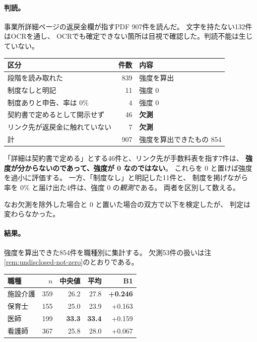 \paragraph{判読。}

事業所詳細ページの返戻金欄が指すPDF 907件を読んだ。
文字を持たない132件はOCRを通し、
OCRでも確定できない箇所は目視で確認した。判読不能は生じていない。

\begin{center}
\begin{tabularx}{\textwidth}{@{}lrX@{}}
\toprule
区分 & 件数 & 内容 \\
\midrule
段階を読み取れた & 839 & 強度を算出 \\
制度なしと明記 & 11 & 強度 0 \\
制度ありと申告、率は 0\% & 4 & 強度 0 \\
契約書で定めるとして開示せず & 46 & \textbf{欠測} \\
リンク先が返戻金に触れていない & 7 & \textbf{欠測} \\
\midrule
計 & 907 & 強度を算出できたもの 854 \\
\bottomrule
\end{tabularx}
\label{tab:henreikin-read}
\end{center}

\begin{remark}
\label{rem:undisclosed-not-zero}
「詳細は契約書で定める」とする46件と、リンク先が手数料表を指す7件は、
\textbf{強度が分からないのであって、強度が 0 なのではない}。
これらを 0 と置けば強度を過小に評価する。
一方、「制度なし」と明記した11件と、
制度を掲げながら率を 0\% と届け出た4件は、強度 0 の\emph{観測}である。
両者を区別して数える。

なお欠測を除外した場合と 0 と置いた場合の双方で以下を検定したが、
判定は変わらなかった。
\end{remark}

\paragraph{結果。}

強度を算出できた854件を職種別に集計する。
欠測53件の扱いは注\ref{rem:undisclosed-not-zero}のとおりである。

\begin{center}
\begin{tabular}{@{}lrrrr@{}}
\toprule
職種 & $n$ & 中央値 & 平均 & B1 \\
\midrule
施設介護 & 359 & 26.2 & 27.8 & \textbf{+0.246} \\
保育士 & 155 & 25.0 & 23.9 & +0.163 \\
医師 & 199 & \textbf{33.3} & \textbf{33.4} & +0.159 \\
看護師 & 367 & 25.8 & 28.0 & +0.067 \\
\bottomrule
\end{tabular}
\label{tab:predZ-result}
\end{center}

